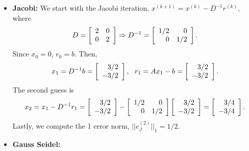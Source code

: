 \begin{questions}
{}
\begin{solution}
\begin{itemize}
\item \textbf{Jacobi:}
We start with the Jacobi iteration, $x^{(k+1)}=x^{(k)}-D^{-1}r^{(k)}$, where
\begin{align*}
D=\left[
	\begin{array}{r r} 
	2 & 0 \\
	0 & 2 \\
	\end{array} \right]\Rightarrow D^{-1}=\left[
	\begin{array}{r r} 
	1/2 & 0 \\
	0 & 1/2 \\
	\end{array} \right].
\end{align*}
Since $x_0=0$, $r_0=b$. Then,
\begin{align*}
x_1=D^{-1}b=\left[
	\begin{array}{r r} 
	3/2 \\
	-3/2 \\
	\end{array} \right],~~r_1=Ax_1-b=\left[
	\begin{array}{r r} 
	3/2 \\
	-3/2 \\
	\end{array} \right].
\end{align*}
The second guess is
\begin{align*}
x_2=x_1-D^{-1}r_1=\left[
	\begin{array}{r r} 
	3/2 \\
	-3/2 \\
	\end{array} \right]-\left[
	\begin{array}{r r} 
	1/2 & 0 \\
	0 & 1/2 \\
	\end{array} \right]\left[
	\begin{array}{r r} 
	3/2 \\
	-3/2 \\
	\end{array} \right]=\left[
	\begin{array}{r r} 
	3/4 \\
	-3/4 \\
	\end{array} \right].
\end{align*}
Lastly, we compute the 1 error norm, $||e_J^{(2)}||_1=1/2$.
\item \textbf{Gauss Seidel:}

\end{itemize}
\end{solution}
\end{questions}
